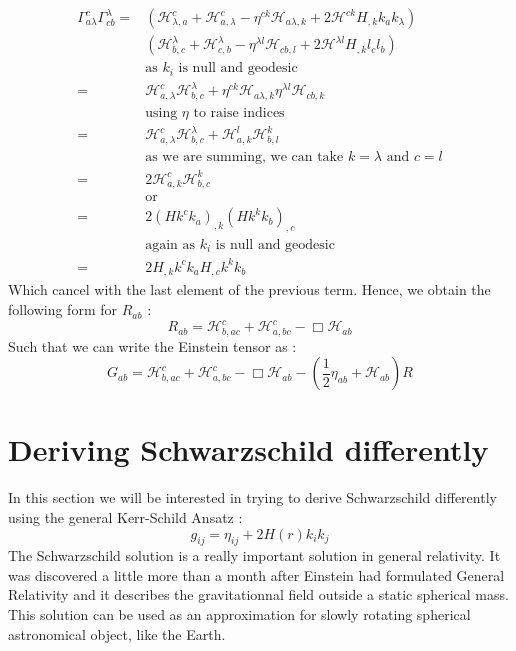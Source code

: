 \documentclass[a4paper,12pt]{article}
\theoremstyle{definition}
\begin{document}
\begin{equation}
\begin{split}
	\Gamma^c_{a\lambda}\Gamma^\lambda_{cb}=&(\mathcal{H}^c_{\lambda,a}+\mathcal{H}^c_{a,\lambda}-\eta^{ck}\mathcal{H}_{a\lambda,k}+2\mathcal{H}^{ck}H_{,k}k_ak_\lambda)\\
	&(\mathcal{H}^\lambda_{b,c}+\mathcal{H}^\lambda_{c,b}-\eta^{\lambda l}\mathcal{H}_{cb,l}+2\mathcal{H}^{\lambda l}H_{,k}l_cl_b)\\
	&\text{as $k_i$ is null and geodesic}\\
	=&\mathcal{H}^c_{a,\lambda}\mathcal{H}^\lambda_{b,c}+\eta^{ck}\mathcal{H}_{a\lambda,k}\eta^{\lambda l}\mathcal{H}_{cb,k}\\
	&\text{using $\eta$ to raise indices}\\
	=&\mathcal{H}^c_{a,\lambda}\mathcal{H}^\lambda_{b,c}+\mathcal{H}^{l}_{a,k}\mathcal{H}^k_{b,l}\\
	&\text{as we are summing, we can take $k=\lambda$ and $c=l$}\\
	=&2\mathcal{H}^c_{a,k}\mathcal{H}^k_{b,c}\\
	&\text{or}\\
	=&2(Hk^ck_a)_{,k}(Hk^k k_b)_{,c}\\
	&\text{again as $k_i$ is null and geodesic}\\
	=&2H_{,k}k^ck_aH_{,c}k^k k_b
\end{split}
\end{equation}
Which cancel with the last element of the previous term.
Hence, we obtain the following form for $R_{ab}$ :
\begin{equation}
	R_{ab}=\mathcal{H}^c_{b,ac}+\mathcal{H}^c_{a,bc}-\Box\mathcal{H}_{ab}
\end{equation}
Such that we can write the Einstein tensor as :
\begin{equation}
	G_{ab}=\mathcal{H}^c_{b,ac}+\mathcal{H}^c_{a,bc}-\Box\mathcal{H}_{ab}-(\frac{1}{2}\eta_{ab}+\mathcal{H}_{ab})R
\end{equation}

\section{Deriving Schwarzschild differently}
In this section we will be interested in trying to derive Schwarzschild differently using the general Kerr-Schild Ansatz :
\begin{equation}
	g_{ij}=\eta_{ij}+2H(r)k_ik_j
\end{equation}
The Schwarzschild solution is a really important solution in general relativity.
It was discovered a little more than a month after Einstein had formulated General Relativity and it describes the gravitationnal field outside a static spherical mass.
This solution can be used as an approximation for slowly rotating spherical astronomical object, like the Earth.
\end{document}
